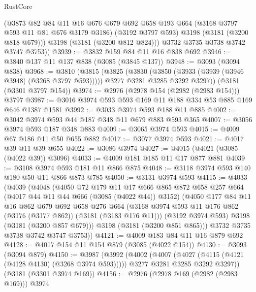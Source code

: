 \begin{lexlean}{RustCore}
\begin{coremodule}
          (@3873
            @82
            @84
            @11
            @16
            @676
            @679
            @692
            @658
            @193
            @664
            (@3168 @3797 @593 @11 @81 @676 @3179 @3186)
            (@3192 @3797 @593)
            @3198
            (@3181 (@3200 @818 @679)))
          @3198
          (@3181 (@3200 @812 @824)))
        @3732
        @3735
        @3738
        @3742
        @3747
        @3753))
@3939 := @3832 @159 @84 @11 @16 @838 @692
@3946 := @3840 @137 @11 @137 @838 (@3085 (@3845 @137))
@3948 := @3093 (@3094 @838)
@3968 := @3810
    (@3815
      (@3825
        (@3830 (@3850 (@3933 (@3939 (@3946 @3948) (@3268 @3797 @593)))))
        @3277
        @3281
        @3285
        @3292
        @3297))
    (@3181 (@3301 @3797 @154))
@3974 := @2976 (@2978 @154 (@2982 (@2983 @154))) @3797
@3987 := @3016 @3974 @593 @593 @169 @11 @188 @334 @53 @885 @169 @646 @1387 @1581
@3992 := @3033 @3974 @593 @188 @11 @885
@4002 := @3042 @3974 @593 @44 @187 @348 @11 @679 @883 @593 @365
@4007 := @3056 @3974 @593 @187 @348 @883
@4009 := @3065 @3974 @593
@4015 := @4009 @67 @186 @11 @50 @655 @882
@4017 := @3077 @3974 @593
@4021 := @4017 @39 @11 @39 @655
@4022 := @3086 @3974
@4027 := @4015 (@4021 (@3085 (@4022 @39)) @3096)
@4033 := @4009 @181 @185 @11 @17 @877 @881
@4039 := @3108 @3974 @593 @181 @11 @866 @875
@4048 := @3118 @3974 @593 @140 @180 @50 @11 @866 @873 @785
@4050 := @3131 @3974 @593
@4115 := @4033
    (@4039
      (@4048
        (@4050
          @72
          @179
          @11
          @17
          @666
          @865
          @872
          @658
          @257
          @664
          (@4017 @44 @11 @44 @666 (@3085 (@4022 @44)) @3152)
          (@4050
            @177
            @84
            @11
            @16
            @862
            @679
            @692
            @658
            @276
            @664
            (@3168 @3974 @593 @11 @176 @862 (@3176 (@3177 @862)) (@3181 (@3183 @176 @11)))
            (@3192 @3974 @593)
            @3198
            (@3181 (@3200 @857 @679)))
          @3198
          (@3181 (@3200 @851 @865)))
        @3732
        @3735
        @3738
        @3742
        @3747
        @3753))
@4121 := @4009 @183 @84 @11 @16 @879 @692
@4128 := @4017 @154 @11 @154 @879 (@3085 (@4022 @154))
@4130 := @3093 (@3094 @879)
@4150 := @3987
    (@3992
      (@4002
        (@4007 (@4027 (@4115 (@4121 (@4128 @4130) (@3268 @3974 @593)))))
        @3277
        @3281
        @3285
        @3292
        @3297))
    (@3181 (@3301 @3974 @169))
@4156 := @2976 (@2978 @169 (@2982 (@2983 @169))) @3974

\end{coremodule}
\end{lexlean}
